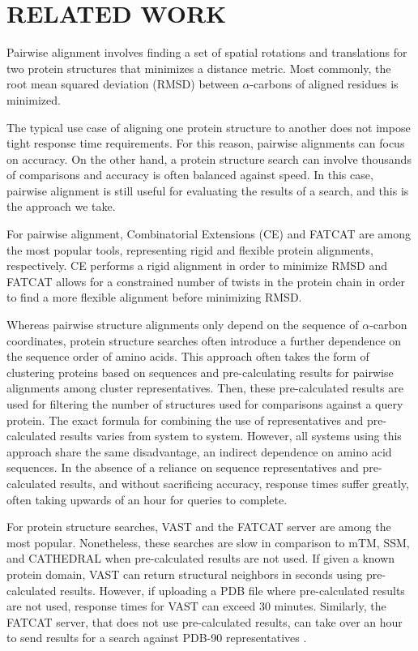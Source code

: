 \documentclass[a4,center,fleqn]{NAR}
\newcommand{\ca}{$\alpha$-carbon\xspace}
\newcommand{\cas}{$\alpha$-carbons\xspace}
\begin{document}
\section{RELATED WORK}

Pairwise alignment involves finding a set of spatial rotations and translations for two protein structures that minimizes a distance metric. 
Most commonly, the root mean squared deviation (RMSD) between \cas of aligned residues is minimized.

The typical use case of aligning one protein structure to another does not impose tight response time requirements. 
For this reason, pairwise alignments can focus on accuracy. 
On the other hand, a protein structure search can involve thousands of comparisons and accuracy is often balanced against speed. 
In this case, pairwise alignment is still useful for evaluating the results of a search, and this is the approach we take. 

For pairwise alignment, Combinatorial Extensions (CE) \cite{Shindyalov1998} and FATCAT \cite{Ye2003} are among the most popular tools, representing rigid and flexible protein alignments, respectively. 
CE performs a rigid alignment in order to minimize RMSD and FATCAT allows for a constrained number of twists in the protein chain in order to find a more flexible alignment before minimizing RMSD.

Whereas pairwise structure alignments only depend on the sequence of \ca coordinates, protein structure searches often introduce a further dependence on the sequence order of amino acids.
This approach often takes the form of clustering proteins based on sequences and pre-calculating results for pairwise alignments among cluster representatives. 
Then, these pre-calculated results are used for filtering the number of structures used for comparisons against a query protein.
The exact formula for combining the use of representatives and pre-calculated results varies from system to system.
However, all systems using this approach share the same disadvantage, an indirect dependence on amino acid sequences. 
In the absence of a reliance on sequence representatives and pre-calculated results, and without sacrificing accuracy, response times suffer greatly, often taking upwards of an hour for queries to complete. 

For protein structure searches, VAST \cite{Gilbrat1996} and the FATCAT server \cite{Ye2004} are among the most popular. 
Nonetheless, these searches are slow in comparison to mTM, SSM, and CATHEDRAL when pre-calculated results are not used. 
If given a known protein domain, VAST can return structural neighbors in seconds using pre-calculated results. 
However, if uploading a PDB file where pre-calculated results are not used, response times for VAST can exceed 30 minutes. 
Similarly, the FATCAT server, that does not use pre-calculated results, can take over an hour to send results for a search against PDB-90 representatives \cite{Prlic2010}. 
\end{document}
